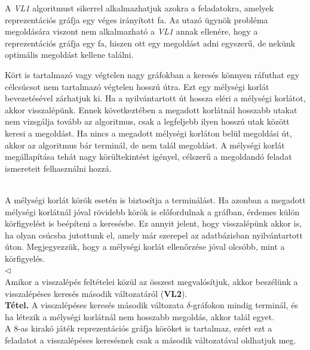 \documentclass[12pt,margin=0px]{article}
\begin{document}
    \noindent A \emph{VL1} algoritmust sikerrel alkalmazhatjuk azokra a feladatokra, amelyek reprezentációs gráfja egy véges irányított fa. Az utazó ügynök probléma megoldására viszont nem alkalmazható a \emph{VL1} annak ellenére, hogy a reprezentációs gráfja egy fa, hiszen ott egy megoldást adni egyszerű, de nekünk optimális megoldást kellene találni.\\

    {\footnotesize
    \noindent {\color{blue} \faLightbulbO\ $\triangleright$ }

    \noindent Kört is tartalmazó vagy végtelen nagy gráfokban a keresés könnyen ráfuthat egy célcsúcsot nem tartalmazó végtelen hosszú útra. Ezt egy mélységi korlát bevezetésével zárhatjuk ki. Ha a nyilvántartott út hossza eléri a mélységi korlátot, akkor visszalépünk. Ennek következtében a megadott korlátnál hosszabb utakat nem vizsgálja tovább az algoritmus, csak a legfeljebb ilyen hosszú utak között keresi a megoldást. Ha nincs a megadott mélységi korláton belül megoldási út, akkor az algoritmus bár terminál, de nem talál megoldást. A mélységi korlát megállapítása tehát nagy körültekintést igényel, célszerű a megoldandó feladat ismereteit felhasználni hozzá.}\\

    {\footnotesize
    \noindent A mélységi korlát körök esetén is biztosítja a terminálást. Ha azonban a megadott mélységi korlátnál jóval rövidebb körök is előfordulnak a gráfban, érdemes külön körfigyelést is beépíteni a keresésbe. Ez annyit jelent, hogy visszalépünk akkor is, ha olyan csúcsba jutottunk el, amely már szerepel az adatbázisban nyilvántartott úton. Megjegyezzük, hogy a mélységi korlát ellenőrzése jóval olcsóbb, mint a körfigyelés.\\
    $\triangleleft$ \faLightbulbO
    }\\

    \noindent Amikor a visszalépés feltételei közül az összest megvalósítjuk, akkor beszélünk a visszalépéses keresés második változatáról (\textbf{VL2}).\\

    \noindent \textbf{Tétel.} A visszalépéses keresés második változata $\delta$-gráfokon mindig terminál, és ha létezik a mélységi korlátnál nem hosszabb megoldás, akkor talál egyet.\\

    \noindent A 8-as kirakó játék reprezentációs gráfja köröket is tartalmaz, ezért ezt a feladatot a visszalépéses keresésnek csak a második változatával oldhatjuk meg.
\end{document}

